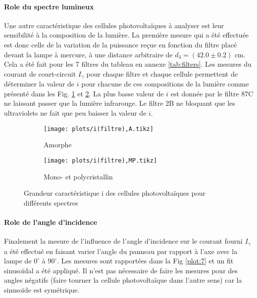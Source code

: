 \paragraph*{Role du spectre lumineux}

Une autre caractéristique des cellules photovoltaïques à analyser est leur sensibilité à la composition de la lumière. La première mesure qui a été effectuée est donc celle de la variation de la puissance reçue en fonction du filtre placé devant la lampe à mercure, à une distance arbitraire de \(d_3 = (42.0 \pm 0.2)\) \unit{\centi\meter}. Cela a été fait pour les 7 filtres du tableau en annexe \ref{tab:filters}. Les mesures du courant de court-circuit \(I_\gamma\) pour chaque filtre et chaque cellule permettent de déterminer la valeur de \(i\) pour chacune de ces compositions de la lumière comme présenté dans les Fig. \ref{plot:6a} et \ref{plot:6b}. La plus basse valeur de \(i\) est donnée par le filtre 87C ne laissant passer que la lumière infrarouge. Le filtre 2B ne bloquant que les ultraviolets ne fait que peu baisser la valeur de \(i\).

\begin{figure}[h]
    \centering
    \begin{subfigure}[t]{0.45\linewidth}
        \centering
        \texttt{[image: plots/i(filtre),A.tikz]}
        \caption{Amorphe}
        \label{plot:6a}
    \end{subfigure}
    \begin{subfigure}[t]{0.45\linewidth}
        \centering
        \texttt{[image: plots/i(filtre),MP.tikz]}
        \caption{Mono- et polycristallin}
        \label{plot:6b}
    \end{subfigure}
    \caption{Grandeur caractéristique i des cellules photovoltaïques pour différents spectres}
    \label{plot:6}
\end{figure}

\paragraph*{Role de l'angle d'incidence}
Finalement la mesure de l'influence de l'angle d'incidence sur le courant fourni \(I_\gamma\) a été effectué en faisant varier l'angle du panneau par rapport à l'axe avec la lampe de \(0^{\circ}\) à \(90^{\circ}\). Les mesures sont rapportées dans la Fig \ref{plot:7} et un fit sinusoïdal a été appliqué. Il n'est pas nécessaire de faire les mesures pour des angles négatifs (faire tourner la cellule photovoltaïque dans l'autre sens) car la sinusoïde est symétrique.

